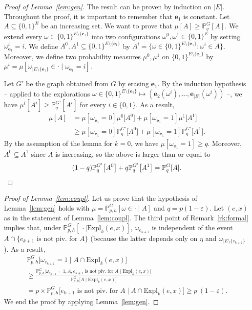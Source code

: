 \documentclass[10pt]{amsart}
\theoremstyle{definition}\newtheorem{defi}[theo]{Definition}\newtheorem{rema}[theo]{Remark}\newtheorem{exam}[theo]{Example}\newtheorem{exem}[theo]{Example}\newtheorem{nota}[theo]{Notation}
\newcommand{\Pro}{\mathbb{P}}
\newcommand{\ee}{\mathbf{e}}
\newcommand{\Expl}{\mathrm{Expl}}
\begin{document}
\begin{proof}[Proof of Lemma~\ref{lem:gen}]
The result can be proven by induction on $|E|$. Throughout the proof, it is important to remember that $\ee_1$ is constant. Let $A\subseteq\{0,1\}^E$ be an increasing set. We want to prove that $\mu[A]\ge\Pro^G_q[A]$. We extend every $\omega \in \{0,1\}^{E\setminus\{\ee_1\}}$ into two configurations $\omega^0,\omega^1\in\{0,1\}^E$ by setting $\omega^i_{\ee_1}=i$. We define $A^0,A^1\subseteq\{0,1\}^{E\setminus\{\ee_1\}}$ by $A^i=\{\omega \in \{0,1\}^{E\setminus\{\ee_1\}} : \omega^i \in A\}$. Moreover, we define two probability measures $\mu^0,\mu^1$ on $\{0,1\}^{E\setminus\{\ee_1\}}$ by $\mu^i=\mu[\omega_{|E\setminus\{\ee_1\}}\in\cdot\mid\omega_{\ee_1}=i]$.


Let $G'$ be the graph obtained from $G$ by erasing $\ee_1$. By the induction hypothesis -- applied to the explorations $\omega\in\{0,1\}^{E\setminus\{\ee_1\}}\mapsto(\ee_2(\omega^i),\dots,\ee_{|E|}(\omega^i))$ --, we have $\mu^i[A^i]\ge \Pro^{G'}_q[A^i]$ for every $i\in \{0,1\}$. As a result,
\begin{align*}
\mu[A] &=\mu[\omega_{\ee_1}=0]\mu^0\big[A^0\big]+ \mu[\omega_{\ee_1}=1]\mu^1\big[A^1\big]\\
&\ge \mu[\omega_{\ee_1}=0]\Pro_q^{G'} \big[A^0\big]+ \mu[\omega_{\ee_1}=1]\Pro_q^{G'} \big[A^1\big].
\end{align*}
By the assumption of the lemma for $k=0$, we have $ \mu[\omega_{\ee_1}=1] \ge q$. Moreover, $A^0\subseteq A^1$ since $A$ is increasing, so the above is larger than or equal to
\[
(1-q)\Pro_q^{G'} \big[A^0\big]+q \Pro_q^{G'} \big[A^1\big] = \Pro^G_q[A]. \qedhere
\]
\end{proof}

\begin{proof}[Proof of Lemma~\ref{lem:coupl}]
Let us prove that the hypothesis of Lemma~\ref{lem:gen} holds with $\mu=\Pro_{p,h}^G[\omega \in \cdot \mid A]$ and $q=p(1-\varepsilon)$. Let $(e,x)$ as in the statement of Lemma~\ref{lem:coupl}. The third point of Remark~\ref{rk:formal} implies that, under $\Pro_{p,h}^G [\, \cdot \mid \Expl_k(e,x) ]$, $\omega_{e_{k+1}}$ is independent of the event $A \cap \{ \text{$e_{k+1} $ is not piv. for $A$} \}$ (because the latter depends only on $\eta$ and $\omega_{|E\setminus\{e_{k+1}\}}$). As a result,
\pagebreak
\begin{multline*}
\Pro_{p,h}^G \big[\omega_{e_{k+1}} = 1 \; \big| \; A \cap \Expl_k(e,x) \big]\\
\ge \frac{\Pro_{p,h}^G \big[\omega_{e_{k+1}} = 1, A, \text{$e_{k+1} $ is not piv. for $A$} \; \big| \; \Expl_k(e,x) \big]}{\Pro_{p,h}^G \big[A \; \big| \; \Expl_k(e,x) \big]}\\
= p \times\Pro_{p,h}^G \big[\text{$e_{k+1} $ is not piv. for $A$} \; \big| \; A \cap \Expl_k(e,x) \big]\ge p~(1-\varepsilon).
\end{multline*}
We end the proof by applying Lemma~\ref{lem:gen}.
\end{proof}
\end{document}
